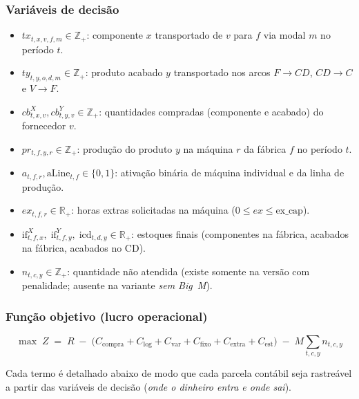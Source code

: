 \documentclass[11pt,a4paper]{article}
\begin{document}
\subsubsection*{Variáveis de decisão}
\begin{itemize}
  \item $tx_{t,x,v,f,m} \in \mathbb{Z}_+$: componente $x$ transportado de $v$ para $f$ via modal $m$ no período $t$.
  \item $ty_{t,y,o,d,m} \in \mathbb{Z}_+$: produto acabado $y$ transportado nos arcos $F{\to}CD$, $CD{\to}C$ e $V{\to}F$.
  \item $cb^X_{t,x,v}, cb^Y_{t,y,v} \in \mathbb{Z}_+$: quantidades compradas (componente e acabado) do fornecedor $v$.
  \item $pr_{t,f,y,r} \in \mathbb{Z}_+$: produção do produto $y$ na máquina $r$ da fábrica $f$ no período $t$.
  \item $a_{t,f,r}, \text{aLine}_{t,f} \in \{0,1\}$: ativação binária de máquina individual e da linha de produção.
  \item $ex_{t,f,r} \in \mathbb{R}_+$: horas extras solicitadas na máquina ($0 \leq ex \leq \text{ex\_cap}$).
  \item $\text{if}^X_{t,f,x},\;\text{if}^Y_{t,f,y},\;\text{icd}_{t,d,y} \in \mathbb{R}_+$: estoques finais (componentes na fábrica, acabados na fábrica, acabados no CD).
  \item $n_{t,c,y} \in \mathbb{Z}_+$: quantidade não atendida (existe somente na versão com penalidade; ausente na variante \emph{sem Big~M}).
\end{itemize}

\subsubsection*{Função objetivo (lucro operacional)}
\begin{equation}
\max\; Z \;=\; R \;-\; \bigl(C_{\text{compra}} + C_{\text{log}} + C_{\text{var}} + C_{\text{fixo}} + C_{\text{extra}} + C_{\text{est}}\bigr) \;-\; M \sum_{t,c,y} n_{t,c,y}
\label{eq:objetivo}
\end{equation}

\noindent Cada termo é detalhado abaixo de modo que cada parcela contábil seja rastreável a partir das variáveis de decisão (\emph{onde o dinheiro entra e onde sai}).
\end{document}
